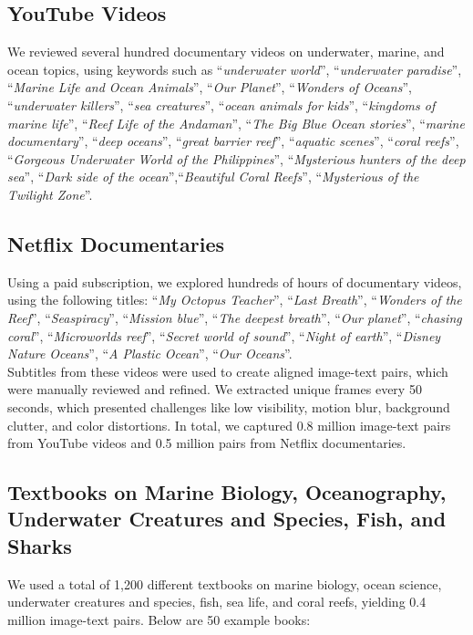 \subsection{YouTube Videos} 
We reviewed several hundred documentary videos on underwater, marine, and ocean topics, using keywords such as ``\textit{underwater world}'', ``\textit{underwater paradise}'', ``\textit{Marine Life and Ocean Animals}'', ``\textit{Our Planet}'', ``\textit{Wonders of Oceans}'', ``\textit{underwater killers}'',  ``\textit{sea creatures}'', ``\textit{ocean animals for kids}'', ``\textit{kingdoms of marine life}'', ``\textit{Reef Life of the Andaman}'', ``\textit{The Big Blue Ocean stories}'', ``\textit{marine documentary}'', ``\textit{deep oceans}'', ``\textit{great barrier reef}'', ``\textit{aquatic scenes}'',  ``\textit{coral reefs}'', ``\textit{Gorgeous Underwater World of the Philippines}'', ``\textit{Mysterious hunters of the deep sea}'', ``\textit{Dark side of the ocean}'',``\textit{Beautiful Coral Reefs}'', ``\textit{Mysterious of the Twilight Zone}''.\\

\subsection{Netflix Documentaries} 
Using a paid subscription, we explored hundreds of hours of documentary videos, using the following titles: ``\textit{My Octopus Teacher}'', ``\textit{Last Breath}'', ``\textit{Wonders of the Reef}'', ``\textit{Seaspiracy}'', ``\textit{Mission blue}'', ``\textit{The deepest breath}'', ``\textit{Our planet}'', ``\textit{chasing coral}'', ``\textit{Microworlds reef}'', ``\textit{Secret world of sound}'', ``\textit{Night of earth}'', ``\textit{Disney Nature Oceans}'', ``\textit{A Plastic Ocean}'', ``\textit{Our Oceans}''.\\

\noindent Subtitles from these videos were used to create aligned image-text pairs, which were manually reviewed and refined. 
We extracted unique frames every 50 seconds, which presented challenges like low visibility, motion blur, background clutter, and color distortions. 
In total, we captured 0.8 million image-text pairs from YouTube videos and 0.5 million pairs from Netflix documentaries.

\subsection{Textbooks on Marine Biology, Oceanography, Underwater Creatures and Species, Fish, and Sharks} 
We used a total of 1,200 different textbooks on marine biology, ocean science, underwater creatures and species, fish, sea life, and coral reefs, yielding 0.4 million image-text pairs. Below are 50 example books:  


